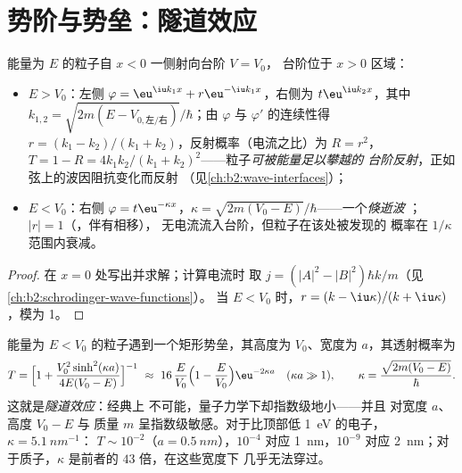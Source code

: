 \section{势阶与势垒：隧道效应}

\begin{proposition}[势阶]\label{prop:b2:potential-wells-tunneling:step}
能量为 $E$ 的粒子自 $x < 0$ 一侧射向台阶 $V = V_0$，
台阶位于 $x > 0$ 区域：
\begin{itemize}
\item $E > V_0$：左侧 $\varphi = \eu^{\iu k_1x} + r\eu^{-\iu k_1x}$，右侧为 $t\eu^{\iu
      k_2x}$，其中 $k_{1,2} = \sqrt{2m(E - V_{0,\text{左/右}})}/
      \hbar$；由 $\varphi$ 与 $\varphi'$ 的连续性得 $r = (k_1 - k_2)/(k_1
      + k_2)$，反射概率（电流之比）为 $R = r^2$，
      $T = 1 - R = 4k_1k_2/(k_1 + k_2)^2$——粒子\emph{可被能量足以攀越的
      台阶反射}，正如弦上的波因阻抗变化而反射
      （见\cref{ch:b2:wave-interfaces}）；
\item $E < V_0$：右侧 $\varphi = t\eu^{-\kappa x}$，$\kappa = \sqrt{2m(V_0
      - E)}/\hbar$——一个\emph{倏逝波}
；$|r| = 1$（，伴有相移），
      无电流流入台阶，但粒子在该处被发现的
      概率在 $1/\kappa$ 范围内衰减。
\end{itemize}
\end{proposition}

\begin{proof}
在 $x = 0$ 处写出并求解；计算电流时
取 $j = (|A|^2 - |B|^2)\hbar k/m$（见\cref{ch:b2:schrodinger-wave-functions}）。
当 $E < V_0$ 时，$r = (k - \iu\kappa)/(k + \iu\kappa)$，模为 1。
\end{proof}

\begin{theorem}[穿过势垒的隧道效应]\label{thm:b2:potential-wells-tunneling:tunnel}
能量为 $E < V_0$ 的粒子遇到一个矩形势垒，其高度为
$V_0$、宽度为 $a$，其透射概率为
\[
T = \Big[1 + \frac{V_0^2\sinh^2(\kappa a)}{4E(V_0 - E)}\Big]^{-1}
\ \approx\ 16\,\frac{E}{V_0}\Big(1 - \frac{E}{V_0}\Big)\eu^{-2\kappa a}
\quad (\kappa a \gg 1), \qquad
\kappa = \frac{\sqrt{2m(V_0 - E)}}{\hbar} .
\]
这就是\emph{隧道效应}：经典上
不可能，量子力学下却指数级地小——并且
对宽度 $a$、高度 $V_0 - E$ 与
质量 $m$ 呈指数级敏感。对于比顶部低 \qty{1}{eV} 的电子，$\kappa = \qty{5.1}{nm^{-1}}$：
$T \sim 10^{-2}$（$a = \qty{0.5}{nm}$），$10^{-4}$ 对应 \qty{1}{nm}，$10^{-9}$ 对应
\qty{2}{nm}；对于质子，$\kappa$ 是前者的 $43$ 倍，在这些宽度下
几乎无法穿过。
\end{theorem}

